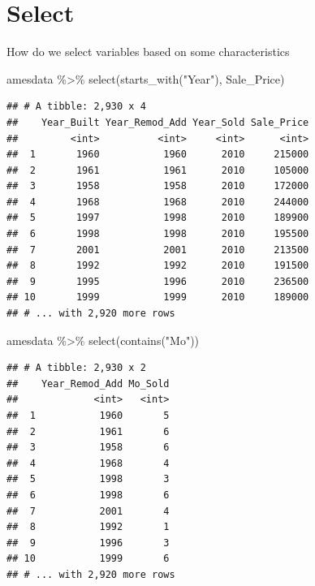 \documentclass[
]{book}
\newenvironment{Shaded}{\begin{snugshade}}{\end{snugshade}}
\newcommand{\FunctionTok}[1]{\textcolor[rgb]{0.00,0.00,0.00}{#1}}
\newcommand{\NormalTok}[1]{#1}
\newcommand{\SpecialCharTok}[1]{\textcolor[rgb]{0.00,0.00,0.00}{#1}}
\newcommand{\StringTok}[1]{\textcolor[rgb]{0.31,0.60,0.02}{#1}}
\theoremstyle{definition}
\theoremstyle{definition}
\theoremstyle{definition}
\theoremstyle{definition}
\theoremstyle{remark}
\begin{document}
\hypertarget{select}{%
\section{Select}\label{select}}

How do we select variables based on some characteristics

\begin{Shaded}
\begin{Highlighting}[]
\NormalTok{amesdata }\SpecialCharTok{\%\textgreater{}\%} \FunctionTok{select}\NormalTok{(}\FunctionTok{starts\_with}\NormalTok{(}\StringTok{"Year"}\NormalTok{), Sale\_Price)}
\end{Highlighting}
\end{Shaded}

\begin{verbatim}
## # A tibble: 2,930 x 4
##    Year_Built Year_Remod_Add Year_Sold Sale_Price
##         <int>          <int>     <int>      <int>
##  1       1960           1960      2010     215000
##  2       1961           1961      2010     105000
##  3       1958           1958      2010     172000
##  4       1968           1968      2010     244000
##  5       1997           1998      2010     189900
##  6       1998           1998      2010     195500
##  7       2001           2001      2010     213500
##  8       1992           1992      2010     191500
##  9       1995           1996      2010     236500
## 10       1999           1999      2010     189000
## # ... with 2,920 more rows
\end{verbatim}

\begin{Shaded}
\begin{Highlighting}[]
\NormalTok{amesdata }\SpecialCharTok{\%\textgreater{}\%} \FunctionTok{select}\NormalTok{(}\FunctionTok{contains}\NormalTok{(}\StringTok{"Mo"}\NormalTok{))}
\end{Highlighting}
\end{Shaded}

\begin{verbatim}
## # A tibble: 2,930 x 2
##    Year_Remod_Add Mo_Sold
##             <int>   <int>
##  1           1960       5
##  2           1961       6
##  3           1958       6
##  4           1968       4
##  5           1998       3
##  6           1998       6
##  7           2001       4
##  8           1992       1
##  9           1996       3
## 10           1999       6
## # ... with 2,920 more rows
\end{verbatim}
\end{document}
